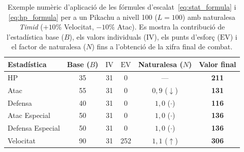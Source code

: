 \begin{table}[htbp]
    \centering
    \caption{Exemple numèric d'aplicació de les fórmules d'escalat~\eqref{eq:stat_formula} i \eqref{eq:hp_formula} per a un Pikachu a nivell 100 ($L=100$) amb naturalesa \emph{Timid} ($+10\%$ Velocitat, $-10\%$ Atac). Es mostra la contribució de l'estadística base ($B$), els valors individuals ($\mathrm{IV}$), els punts d'esforç ($\mathrm{EV}$) i el factor de naturalesa ($N$) fins a l'obtenció de la xifra final de combat.}
    \label{tab:pikachu_stat_example}
    \normalsize
    \setlength{\tabcolsep}{10pt}
    \renewcommand{\arraystretch}{1.25}
    \begin{tabular}{lccccc}
        \toprule
        \textbf{Estadística} & \textbf{Base ($B$)} & \textbf{$\mathrm{IV}$} & \textbf{$\mathrm{EV}$} & \textbf{Naturalesa ($N$)} & \textbf{Valor final} \\
        \midrule
        HP                   & 35                  & 31                     & 0                      & ---                       & \textbf{211}         \\
        Atac                 & 55                  & 31                     & 0                      & $0{,}9$ ($\downarrow$)    & \textbf{131}         \\
        Defensa              & 40                  & 31                     & 0                      & $1{,}0$ ($\cdot$)         & \textbf{116}         \\
        Atac Especial        & 50                  & 31                     & 0                      & $1{,}0$ ($\cdot$)         & \textbf{136}         \\
        Defensa Especial     & 50                  & 31                     & 0                      & $1{,}0$ ($\cdot$)         & \textbf{136}         \\
        Velocitat            & 90                  & 31                     & 252                    & $1{,}1$ ($\uparrow$)      & \textbf{306}         \\
        \bottomrule
    \end{tabular}
\end{table}
